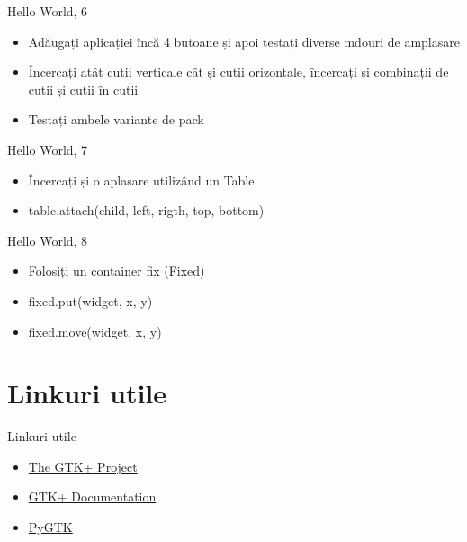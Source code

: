 \documentclass{beamer}
\begin{document}
\begin{frame}{Hello World, 6}
\begin{itemize}
	\item Adăugați aplicației încă 4 butoane și apoi testați diverse mdouri de amplasare
	\item Încercați atât cutii verticale cât și cutii orizontale, încercați și combinații de cutii și cutii în cutii
	\item Testați ambele variante de pack
\end{itemize}
\end{frame}

\begin{frame}{Hello World, 7}
\begin{itemize}
\item Încercați și o aplasare utilizând un Table
\item \pause table.attach(child, left, rigth, top, bottom)
\end{itemize}
\end{frame}

\begin{frame}{Hello World, 8}
\begin{itemize}
\item Folosiți un container fix (Fixed)
\item fixed.put(widget, x, y)
\item \pause fixed.move(widget, x, y)
\end{itemize}
\end{frame}

\section{Linkuri utile}
\frame{\tableofcontents[currentsection]}
\begin{frame}{Linkuri utile}
\begin{itemize}
\item \href{http://www.gtk.org/}{The GTK+ Project}
\item \href{http://www.gtk.org/documentation.html}{GTK+ Documentation}
\item \href{http://www.pygtk.org/index.html}{PyGTK}
\end{itemize}
\end{frame}
\end{document}
